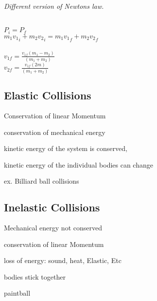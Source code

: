 \documentclass{article}
\begin{document}
    \begin{center}
        \textit{Different version of Newtons law.}
    \end{center}
    
    \begin{center}
        \large
         \\ [15pt]

        $P_i = P_f$\\[15pt]

        $ {m_1v_1}_i +{m_2v_2}_i ={ m_1v_1}_f + {m_2v_2}_f $\\[15pt]

        \\ [15pt]
        $v_{1f} = \frac{v_{1f}(m_1-m_2)} {(m_1 + m_2)}$ \\ [15pt]

        $v_{2f} = \frac{v_{1f}(2m)} {(m_1 + m_2)}$ \\ [15pt]
    \end{center}

    
    \hrulefill
    \subsection{Elastic Collisions}
        \begin{list}{-}{}
            \item Conservation of linear Momentum
            \item conservation of mechanical energy
            \item kinetic energy of the system is conserved, 
            \item kinetic energy of the individual bodies can change
            \item ex. Billiard ball collisions
        \end{list}
    \subsection{Inelastic Collisions}
        \begin{list}{-}{}
            \item Mechanical energy not conserved 
            \item conservation of linear Momentum
            \item loss of energy: sound, heat, Elastic, Etc 
            \item bodies stick together 
            \item paintball
        \end{list}
\end{document}
